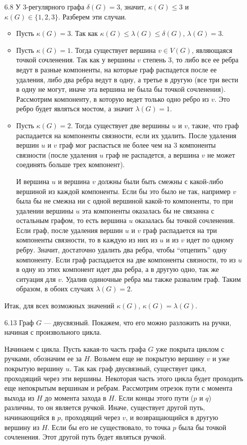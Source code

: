 \documentclass[10pt]{article}
\renewcommand{\leq}{\leqslant}
\begin{document}
\begin{enumerate}
\item[6.8] У 3-регулярного графа $\delta(G) = 3$, значит, $\kappa(G) \leq 3$ и $\kappa(G) \in \{1, 2, 3\}$. Разберем эти случаи.
\begin{itemize}
	\item Пусть $\kappa(G) = 3$. Так как $\kappa(G) \leq \lambda(G) \leq \delta(G)$, $\lambda(G) = 3$.
	\item Пусть $\kappa(G) = 1$. Тогда существует вершина $v \in V(G)$, являющаяся точкой сочленения. Так как у вершины $v$ степень 3, то либо все ее ребра ведут в разные компоненты, на которые граф распадется после ее удаления, либо два ребра ведут в одну, а третье в другую (все три вести в одну не могут, иначе эта вершина не была бы точкой сочленения). Рассмотрим компоненту, в которую ведет только одно ребро из $v$. Это ребро будет являться мостом, а значит $\lambda(G) = 1$.
	\item Пусть $\kappa(G) = 2$. Тогда существует две вершины $u$ и $v$, такие, что граф распадается на компоненты связности, если их удалить. После удаления вершин $u$ и $v$ граф мог распасться не более чем на 3 компоненты связности (после удаления $u$ граф не распадется, а вершина $v$ не может соединять больше трех компонент).
	
	 И вершина $u$ и вершина $v$ должны были быть смежны с какой-либо вершиной из каждой компоненты. Если бы это было не так, например $v$ была бы не смежна ни с одной вершиной какой-то компоненты, то при удалении вершины $u$ эта компоненты оказалась бы не связанна с остальным графом, то есть вершина $u$ оказалась бы точкой сочленения. \\
	Если граф, после удаления вершин $u$ и $v$ граф распадается на три компоненты связности, то в каждую из них из $u$ и из $v$ идет по одному ребру. Значит, достаточно удалить два ребра, чтобы ``отцепить'' одну компоненту. Если граф распадается на две компоненты связности, то из $u$ в одну из этих компонент идет два ребра, а в другую одно, так же ситуация для $v$. Удалив одиночные ребра мы также развалим граф. Таким образом, в обоих случаях $\lambda(G) = 2$.
\end{itemize}
Итак, для всех возможных значений $\kappa(G)$, $\kappa(G) = \lambda(G)$.

\item[6.13] Граф $G$ --- двусвязный. Покажем, что его можно разложить на ручки, начиная с произвольного цикла. 

Начинаем с цикла. Пусть какая-то часть графа $G$ уже покрыта циклом с ручками, обозначим ее за $H$. Возьмем еще не покрытую вершину $v$ и уже покрытую вершину $u$. Так как граф двусвязный, существует цикл, проходящий через эти вершины. Некоторая часть этого цикла будет проходить еще непокрытым вершинам и ребрам. Рассмотрим отрезок пути с момента выхода из $H$ до момента захода в $H$. Если концы этого пути ($p$ и $q$) различны, то он является ручкой. Иначе, существует другой путь, начинающийся в $p$, проходящий через $v$, и возвращающийся в другую вершину из $H$. Если бы его не существовало, то точка $p$ была бы точкой сочленения. Этот другой путь будет являться ручкой.


\end{enumerate}
\end{document}
